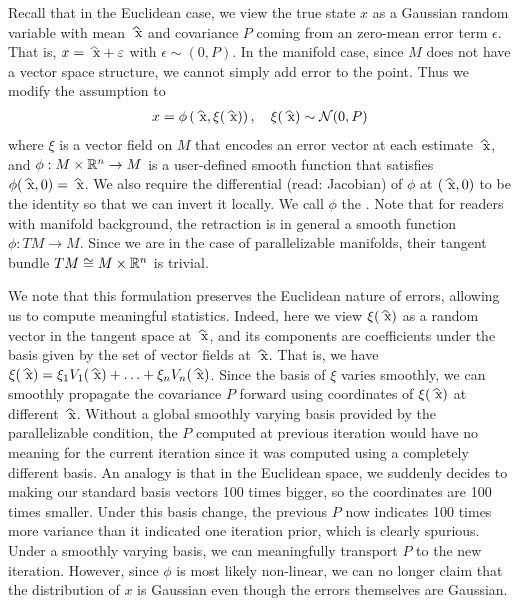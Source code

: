 \documentclass[12pt]{article}
\begin{document}
Recall that in the Euclidean case, we view the true state $ x$ as a Gaussian random variable with mean $ \wh{ x}$ and covariance $ P$ coming from an zero-mean error term $ \epsilon$. That is, $ x = \wh{ x} + \epsilon$ with $ \epsilon \sim (0, P)$. In the manifold case, since $ M$ does not have a vector space structure, we cannot simply add error to the point. Thus we modify the assumption to
\begin{align}
	x = \phi\left(\wh{ x}, \xi( \wh{ x})\right), \quad \xi({\wh{ x}}) \sim \mathcal{ N}(0,P)
\end{align}
where $ \xi$ is a vector field on $ M$ that encodes an error vector at each estimate $ \wh{ x}$, and $ \phi: M \times \mathbb{R}^{n} \to M$ is a user-defined smooth function that satisfies $ \phi( \wh{ x},0) = \wh{ x}$. We also require the differential (read: Jacobian) of $ \phi$ at $ (\wh{ x},0)$ to be the identity so that we can invert it locally. We call $ \phi$ the . Note that for readers with manifold background, the retraction is in general a smooth function $ \phi:TM \to M$. Since we are in the case of parallelizable manifolds, their tangent bundle $ TM \cong M \times \mathbb{R}^{n}$ is trivial.

We note that this formulation preserves the Euclidean nature of errors, allowing us to compute meaningful statistics. Indeed, here we view $ \xi(\wh{ x})$ as a random vector in the tangent space at $ \wh{ x}$, and its components are coefficients under the basis given by the set of vector fields at $ \wh{ x}$. That is, we have $ \xi(\wh{ x}) = \xi_1 V_1(\wh{ x})+\ldots+\xi_n V_n(\wh{ x})$. Since the basis of $ \xi$ varies smoothly, we can smoothly propagate the covariance $ P$ forward using coordinates of $ \xi(\wh{ x})$ at different $ \wh{ x}$. Without a global smoothly varying basis provided by the parallelizable condition, the $ P$ computed at previous iteration would have no meaning for the current iteration since it was computed using a completely different basis. An analogy is that in the Euclidean space, we suddenly decides to making our standard basis vectors 100 times bigger, so the coordinates are 100 times smaller. Under this basis change, the previous $ P$ now indicates 100 times more variance than it indicated one iteration prior, which is clearly spurious. Under a smoothly varying basis, we can meaningfully transport $ P$ to the new iteration. However, since $ \phi$ is most likely non-linear, we can no longer claim that the distribution of $ x$ is Gaussian even though the errors themselves are Gaussian.
\end{document}
